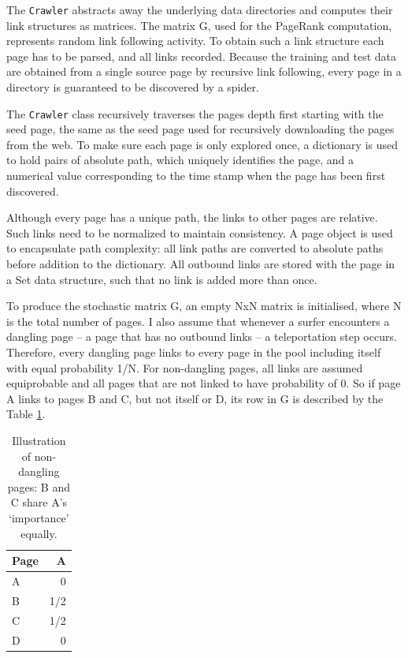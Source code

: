 \documentclass[12pt,notitlepage,twoside]{scrreprt}
\begin{document}
The \texttt{Crawler} abstracts away the underlying data directories and
computes their link structures as matrices.  The matrix G, used for the
PageRank computation, represents random link following activity.  To obtain
such a link structure each page has to be parsed, and all links recorded.
Because the training and test data are obtained from a single source page by recursive link
following, every page in a directory is guaranteed to be discovered by a
spider.

The \texttt{Crawler} class recursively traverses the pages depth first starting with the
seed page, the same as the seed page used for recursively downloading the pages
from the web. To make sure each page is only explored once, a dictionary is
used to hold pairs of absolute path, which uniquely identifies the page, and a
numerical value corresponding to the time stamp when the page has been first
discovered.

Although every page has a unique path, the links to other pages are relative.
Such links need to be normalized to maintain consistency.  A page object is
used to encapsulate path complexity: all link paths are converted to absolute
paths before addition to the dictionary.  All outbound links are stored with
the page in a Set data structure, such that no link is added more than once. 

To produce the stochastic matrix G, an empty NxN matrix is initialised, where N
is the total number of pages. I also assume that whenever a surfer encounters a
dangling page -- a page that has no outbound links -- a teleportation step
occurs. Therefore, every dangling page links to every page in the pool
including itself with equal probability 1/N. For non-dangling pages, all links
are assumed equiprobable and all pages that are not linked to have probability
of 0. So if page A links to pages B and C, but not itself or D, its row in G is
described by the Table \ref{tab}.

\begin{table}
    \begin{center}
      \begin{tabular}{|l|r|}
        \hline
        Page & A \\ \hline
         A &  0  \\ \hline
         B & 1/2 \\ \hline
         C & 1/2 \\ \hline
         D & 0   \\ \hline
      \end{tabular}
      \caption{Illustration of non-dangling pages: B and C share A's `importance' equally.\label{tab}}
  \end{center}
\end{table}
\end{document}
